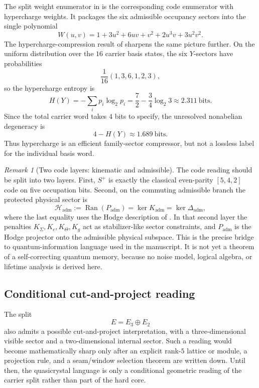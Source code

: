 \documentclass[11pt,a4paper]{article}
\theoremstyle{definition}
\theoremstyle{remark}
\newtheorem*{remark}{Remark}
\newcommand{\Kadm}{K_{\mathrm{adm}}}
\newcommand{\Padm}{P_{\mathrm{adm}}}
\begin{document}
The split weight enumerator in  is the corresponding code enumerator with hypercharge weights. It packages the six admissible occupancy sectors into the single polynomial
\[
W(u,v)
=
1+3u^2+6uv+v^2+2u^3v+3u^2v^2.
\]
The hypercharge-compression result of  sharpens the same picture further. On the uniform distribution over the $16$ carrier basis states, the six $Y$-sectors have probabilities
\[
\frac1{16}(1,3,6,1,2,3),
\]
so the hypercharge entropy is
\[
H(Y)
=
-\sum_i p_i\log_2 p_i
=
\frac72-\frac34\log_2 3
\approx
\num{2.311}\ \text{bits}.
\]
Since the total carrier word takes $4$ bits to specify, the unresolved nonabelian degeneracy is
\[
4-H(Y)\approx \num{1.689}\ \text{bits}.
\]
Thus hypercharge is an efficient family-sector compressor, but not a lossless label for the individual basis word.

\begin{remark}[Two code layers: kinematic and admissible]
The code reading should be split into two layers. First, $S^+$ is exactly the classical even-parity $[5,4,2]$ code on five occupation bits. Second, on the commuting admissible branch the protected physical sector is
\[
\mathcal H_{\mathrm{adm}}
:=
\operatorname{Ran}(\Padm)
=
\ker \Kadm
=
\ker \Delta_{\mathrm{adm}},
\]
where the last equality uses the Hodge description of . In that second layer the penalties $K_\Sigma,K_c,K_\Theta,K_g$ act as stabilizer-like sector constraints, and $\Padm$ is the Hodge projector onto the admissible physical subspace. This is the precise bridge to quantum-information language used in the manuscript. It is not yet a theorem of a self-correcting quantum memory, because no noise model, logical algebra, or lifetime analysis is derived here.
\end{remark}

\subsection{Conditional cut-and-project reading}

The split
\[
E=E_3\oplus E_2
\]
also admits a possible cut-and-project interpretation, with a three-dimensional visible sector and a two-dimensional internal sector. Such a reading would become mathematically sharp only after an explicit rank-$5$ lattice or module, a projection rule, and a seam/window selection theorem are written down. Until then, the quasicrystal language is only a conditional geometric reading of the carrier split rather than part of the hard core.
\end{document}
